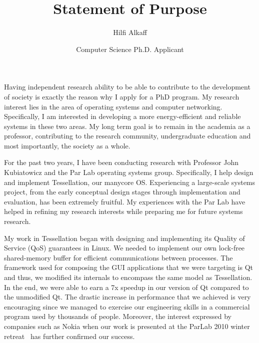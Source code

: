 \documentclass[11pt]{article}
\title{Statement of Purpose}
\author{Hilfi Alkaff}
\date{Computer Science Ph.D. Applicant}
\begin{document}
  \maketitle%

Having independent research ability to be able to contribute to the development of society is exactly the reason why I apply for a PhD program. My research interest lies in the area of operating systems and computer networking. Specifically, I am interested in developing a more energy-efficient and reliable systems in these two areas. My long term goal is to remain in the academia as a professor, contributing to the research community, undergraduate education and most importantly, the society as a whole. \newline

For the past two years, I have been conducting research with Professor John Kubiatowicz and the Par Lab operating systems group. Specifically, I help design and implement Tessellation, our manycore OS. Experiencing a large-scale systems project, from the early conceptual design stages through implementation and evaluation, has been extremely fruitful. My experiences with the Par Lab have helped in refining my research interests while preparing me for future systems research. \newline

My work in Tessellation began with designing and implementing its Quality of Service (QoS) guarantees in Linux. We needed to implement our own lock-free shared-memory buffer for efficient communications between processes. The framework used for composing the GUI applications that we were targeting is Qt and thus, we modified its internals to encompass the same model as Tessellation. In the end, we were able to earn a 7x speedup in our version of Qt compared to the unmodified Qt. The drastic increase in performance that we achieved is very encouraging since we managed to exercise our engineering skills in a commercial program used by thousands of people. Moreover, the interest expressed by companies such as Nokia when our work is presented at the ParLab 2010 winter retreat~\cite{tess_retreat2010} has further confirmed our success. \newline
\end{document}
